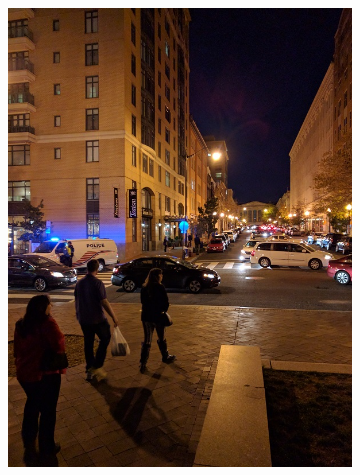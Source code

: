 \documentclass[12pt]{article}
\begin{document}
\begin{figure}[t!]
    \begin{subfigure}[t]{0.3\textwidth}
        \centering
        \includegraphics[width=\linewidth]{../Images/CustomSet2/1}
    \end{subfigure}
    \begin{subfigure}[t]{0.3\textwidth}
        \centering

\end{subfigure}
\end{figure}
\end{document}

